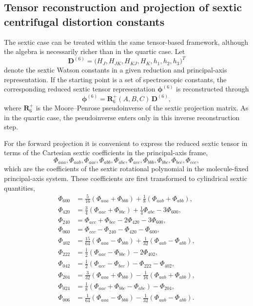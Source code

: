 \subsection{Tensor reconstruction and projection of sextic centrifugal distortion constants}

The sextic case can be treated within the same tensor-based framework,
although the algebra is necessarily richer than in the quartic case.
Let
\[
\mathbf D^{(6)} =
\bigl(
H_J,H_{JK},H_{KJ},H_K,h_1,h_2,h_3
\bigr)^T
\]
denote the sextic Watson constants in a given reduction and principal-axis
representation.  If the starting point is a set of spectroscopic constants, the
corresponding reduced sextic tensor representation
$\boldsymbol\phi^{(6)}$ is reconstructed through
\begin{equation}
\boldsymbol\phi^{(6)}=
\mathbf R_6^{+}(A,B,C)\,\mathbf D^{(6)},
\label{eq:sextic_pseudoinverse}
\end{equation}
where $\mathbf R_6^{+}$ is the Moore--Penrose pseudoinverse of the sextic
projection matrix.  As in the quartic case, the pseudoinverse enters only in
this inverse reconstruction step.

For the forward projection it is convenient to express the reduced sextic tensor
in terms of the Cartesian sextic coefficients in the principal-axis frame,
\[
\Phi_{aaa},\Phi_{aab},\Phi_{aac},\Phi_{abb},\Phi_{abc},\Phi_{acc},
\Phi_{bbb},\Phi_{bbc},\Phi_{bcc},\Phi_{ccc},
\]
which are the coefficients of the sextic rotational polynomial in the
molecule-fixed principal-axis system.
These coefficients are first transformed to cylindrical sextic quantities,
\begin{align}
\Phi_{600} &= \frac{5}{16}(\Phi_{aaa}+\Phi_{bbb})
+\frac{1}{8}(\Phi_{aab}+\Phi_{abb}),\\
\Phi_{420} &= \frac{3}{4}(\Phi_{aac}+\Phi_{bbc})
+\frac{1}{4}\Phi_{abc}-3\Phi_{600},\\
\Phi_{240} &= \Phi_{acc}+\Phi_{bcc}-2\Phi_{420}-3\Phi_{600},\\
\Phi_{060} &= \Phi_{ccc}-\Phi_{240}-\Phi_{420}-\Phi_{600},\\
\Phi_{402} &= \frac{15}{64}(\Phi_{aaa}-\Phi_{bbb})
+\frac{1}{32}(\Phi_{aab}-\Phi_{abb}),\\
\Phi_{222} &= \frac{1}{2}(\Phi_{aac}-\Phi_{bbc})-2\Phi_{402},\\
\Phi_{042} &= \frac{1}{2}(\Phi_{acc}-\Phi_{bcc})
-\Phi_{222}-\Phi_{402},\\
\Phi_{204} &= \frac{3}{32}(\Phi_{aaa}+\Phi_{bbb})
-\frac{1}{16}(\Phi_{aab}+\Phi_{abb}),\\
\Phi_{024} &= \frac{1}{8}(\Phi_{aac}+\Phi_{bbc}-\Phi_{abc})
-\Phi_{204},\\
\Phi_{006} &= \frac{1}{64}(\Phi_{aaa}-\Phi_{bbb})
-\frac{1}{32}(\Phi_{aab}-\Phi_{abb}).
\end{align}

